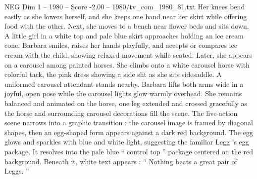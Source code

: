 \begin{textsample}{NEG Dim 1 – 1980 – Score -2.00 – 1980/tv\_com\_1980\_81.txt}
Her knees bend easily as she lowers herself, and she keeps one hand near her skirt while offering food with the other.
Next, she moves to a bench near flower beds and sits down.
A little girl in a white top and pale blue skirt approaches holding an ice cream cone.
Barbara smiles, raises her hands playfully, and accepts or compares ice cream with the child, showing relaxed movement while seated.
Later, she appears on a carousel among painted horses.
She climbs onto a white carousel horse with colorful tack, the pink dress showing a side slit as she sits sidesaddle.
A uniformed carousel attendant stands nearby.
Barbara lifts both arms wide in a joyful, open pose while the carousel lights glow warmly overhead.
She remains balanced and animated on the horse, one leg extended and crossed gracefully as the horse and surrounding carousel decorations fill the scene.
The live-action scene narrows into a graphic transition : the carousel image is framed by diagonal shapes, then an egg-shaped form appears against a dark red background.
The egg glows and sparkles with blue and white light, suggesting the familiar Legg ’s egg package.
It resolves into the pale blue “ control top ” package centered on the red background.
Beneath it, white text appears : “ Nothing beats a great pair of Leggs. ”

\end{textsample}
